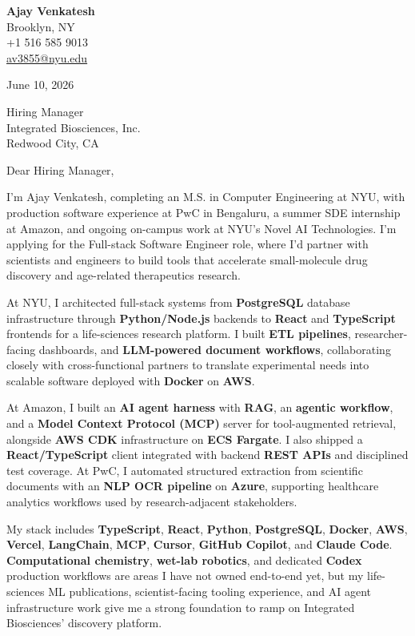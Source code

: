 \documentclass[letterpaper,11pt]{article}
\begin{document}
\begin{flushleft}
\textbf{\large Ajay Venkatesh} \\
Brooklyn, NY \\
+1 516 585 9013 \\
\href{mailto:av3855@nyu.edu}{av3855@nyu.edu}
\end{flushleft}
\vspace{10pt}
June 10, 2026
\vspace{6pt}

Hiring Manager \\
Integrated Biosciences, Inc. \\
Redwood City, CA

\vspace{10pt}

Dear Hiring Manager,

I'm Ajay Venkatesh, completing an M.S. in Computer Engineering at NYU, with production software experience at PwC in Bengaluru, a summer SDE internship at Amazon, and ongoing on-campus work at NYU's Novel AI Technologies. I'm applying for the Full-stack Software Engineer role, where I'd partner with scientists and engineers to build tools that accelerate small-molecule drug discovery and age-related therapeutics research.

At NYU, I architected full-stack systems from \textbf{PostgreSQL} database infrastructure through \textbf{Python/Node.js} backends to \textbf{React} and \textbf{TypeScript} frontends for a life-sciences research platform. I built \textbf{ETL pipelines}, researcher-facing dashboards, and \textbf{LLM-powered document workflows}, collaborating closely with cross-functional partners to translate experimental needs into scalable software deployed with \textbf{Docker} on \textbf{AWS}.

At Amazon, I built an \textbf{AI agent harness} with \textbf{RAG}, an \textbf{agentic workflow}, and a \textbf{Model Context Protocol (MCP)} server for tool-augmented retrieval, alongside \textbf{AWS CDK} infrastructure on \textbf{ECS Fargate}. I also shipped a \textbf{React/TypeScript} client integrated with backend \textbf{REST APIs} and disciplined test coverage. At PwC, I automated structured extraction from scientific documents with an \textbf{NLP OCR pipeline} on \textbf{Azure}, supporting healthcare analytics workflows used by research-adjacent stakeholders.

My stack includes \textbf{TypeScript}, \textbf{React}, \textbf{Python}, \textbf{PostgreSQL}, \textbf{Docker}, \textbf{AWS}, \textbf{Vercel}, \textbf{LangChain}, \textbf{MCP}, \textbf{Cursor}, \textbf{GitHub Copilot}, and \textbf{Claude Code}. \textbf{Computational chemistry}, \textbf{wet-lab robotics}, and dedicated \textbf{Codex} production workflows are areas I have not owned end-to-end yet, but my life-sciences ML publications, scientist-facing tooling experience, and AI agent infrastructure work give me a strong foundation to ramp on Integrated Biosciences' discovery platform.
\end{document}
